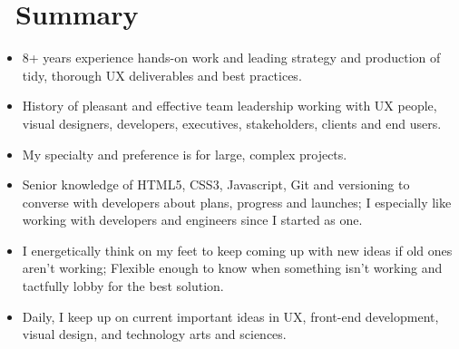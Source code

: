 \documentclass{resume}
\begin{document}



\section{\faUser\ Summary}
  \begin{itemize}
    \item 8+ years experience hands-on work and leading strategy and production of tidy, thorough UX deliverables and best practices.
    \item History of pleasant and effective team leadership working with UX people, visual designers, developers, executives, stakeholders, clients and end users.
    \item My specialty and preference is for large, complex projects.
    \item Senior knowledge of HTML5, CSS3, Javascript, Git and versioning to converse with developers about plans, progress and launches; I especially like working with developers and engineers since I started as one.
    \item I energetically think on my feet to keep coming up with new ideas if old ones aren't working; Flexible enough to know when something isn't working and tactfully lobby for the best solution.
    \item Daily, I keep up on current important ideas in UX, front-end development, visual design, and technology arts and sciences.
  \end{itemize}
\end{document}
